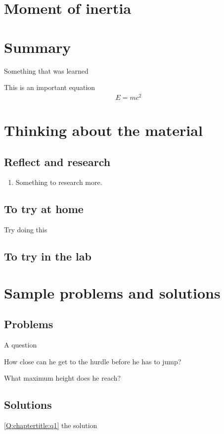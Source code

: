 \section{Moment of inertia}


\newpage
\section{Summary}

\begin{chapterSummary}{
\item Something that was learned
}
\end{chapterSummary}

\newpage
\begin{importantEquations}
This is an important equation
\begin{align*}
E = mc^2
\end{align*}

\end{importantEquations}


\newpage
\section{Thinking about the material}
\subsection{Reflect and research}

\begin{enumerate}
\item Something to research more.
\end{enumerate}
\subsection{To try at home}

\begin{tQuestion}Try doing this \end{tQuestion}

\subsection{To try in the lab}

\newpage
\section{Sample problems and solutions}
\subsection{Problems}
\begin{problemParts}{A question\label{Q:chaptertitle:q1}}
\item How close can he get to the hurdle before he has to jump?
\item What maximum height does he reach?
\end{problemParts}

\newpage
\subsection{Solutions}
\begin{solution}{\ref{Q:chaptertitle:q1}}
{
the solution
}
\end{solution}

